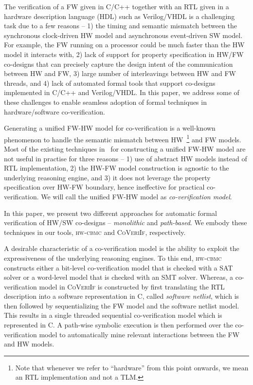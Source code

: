 \documentclass[sigconf]{acmart}
\newcommand{\tool}[1]{\textsc{#1}\xspace}
\newcommand{\hwcbmcv}{\tool{hw-cbmc}}
\newcommand{\verifox}{\tool{CoVeriIf}}
\begin{document}
The verification of a FW given in C/C++ together with an RTL given in a hardware
description language (HDL) such as Verilog/VHDL is a challenging task due to a
few reasons -- 1) the timing and semantic mismatch between the synchronous
clock-driven HW model and asynchronous event-driven SW model. For example, the
FW running on a processor could be much faster than the HW
model it interacts with, 2) lack of support for property specification in 
HW/FW co-designs that can precisely capture the design intent of the 
communication between HW and FW, 3) large
number of interleavings between HW and FW threads, and 4) lack 
of automated formal tools that support co-designs implemented in C/C++ and 
Verilog/VHDL.   In this paper, we address some of these challenges to enable
seamless adoption of formal techniques in hardware/software co-verification.   


Generating a unified FW-HW model for co-verification is a 
well-known phenomenon to handle the semantic mismatch between  
HW~\footnote{Note that whenever we refer to ``hardware'' 
from this point onwards, we mean an RTL implementation 
and not a TLM.}  and FW models.  Most of the existing techniques 
in~\cite{fmsd02,emsoft07,fase10} for constructing a unified FW-HW model are not 
useful in practise for three reasons -- 1) use of abstract HW models 
instead of RTL implementation, 2) the HW-FW model
construction is agnostic to the underlying reasoning engine, and 3) 
it does not leverage the property specification over HW-FW boundary, hence 
ineffective for practical co-verification.  We will call the unified FW-HW 
model as \emph{co-verification model}. 

In this paper, we present two different approaches for automatic formal
verification of HW/SW co-designs -- \emph{monolithic} and \emph{path-based}.  
We embody these techniques in our tools, \hwcbmcv and \verifox, respectively. 


A desirable characteristic of a co-verification model is the ability to exploit 
the expressiveness of the underlying reasoning engines.  To this end, \hwcbmcv
constructs either a bit-level co-verification model that is checked with a SAT solver 
or a word-level model that is checked with an SMT solver.  Whereas, a 
co-verification model in \verifox is constructed 
by first translating the RTL description into a software representation in C,
called \emph{software netlist}, which is then followed by sequentializing the FW 
model and the software netlist model.  This results in a single
threaded sequential co-verification model which is represented in C. A path-wise 
symbolic execution is then performed over the co-verification model to
automatically mine relevant interactions between the FW and HW models.   
\end{document}
